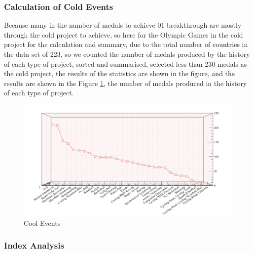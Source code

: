 \documentclass{mcmthesis}
\begin{document}
\subsubsection{Calculation of Cold Events}
Because many in the number of medals to achieve 01 breakthrough are mostly through the cold project to achieve, so here for the Olympic Games in the cold project for the calculation and summary, due to the total number of countries in the data set of 223, so we counted the number of medals produced by the history of each type of project, sorted and summarised, selected less than 230 medals as the cold project, the results of the statistics are shown in the figure, and the results are shown in the Figure \ref{coolevents}, the number of medals produced in the history of each type of project.
	\begin{figure}[H]
	\centering
	\includegraphics[width=1\linewidth]{fig/coolevents.png}
	\caption{Cool Events}
	\label{coolevents}
\end{figure}
\subsubsection{Index Analysis}
\end{document}

